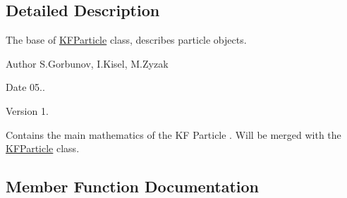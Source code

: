\subsection{Detailed Description}
The base of \hyperlink{classKFParticle}{K\+F\+Particle} class, describes particle objects. 

\begin{DoxyAuthor}{Author}
S.\+Gorbunov, I.\+Kisel, M.\+Zyzak 
\end{DoxyAuthor}
\begin{DoxyDate}{Date}
05.. 
\end{DoxyDate}
\begin{DoxyVersion}{Version}
1.
\end{DoxyVersion}
Contains the main mathematics of the KF Particle . Will be merged with the \hyperlink{classKFParticle}{K\+F\+Particle} class. 

\subsection{Member Function Documentation}
